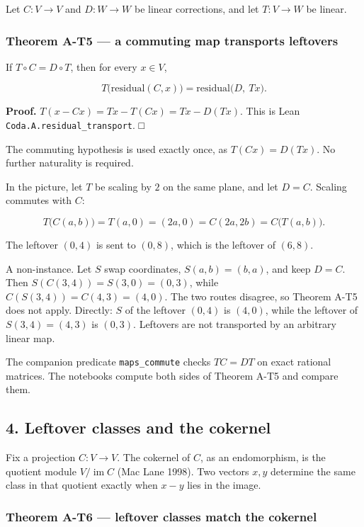 \documentclass[
  11pt,
]{article}
\begin{document}
Let \(C:V\to V\) and \(D:W\to W\) be linear corrections, and let \(T:V\to W\) be linear.

\subsubsection{Theorem A-T5 --- a commuting map transports leftovers}\label{theorem-a-t5-a-commuting-map-transports-leftovers}

If \(T\circ C=D\circ T\), then for every \(x\in V\),

\[
T\bigl(\mathrm{residual}(C,x)\bigr)
=
\mathrm{residual}\bigl(D,\ Tx\bigr).
\]

\textbf{Proof.} \(T(x-Cx)=Tx-T(Cx)=Tx-D(Tx)\). This is Lean \nolinkurl{Coda.A.residual_transport}. □

The commuting hypothesis is used exactly once, as \(T(Cx)=D(Tx)\). No further naturality is required.

In the picture, let \(T\) be scaling by \(2\) on the same plane, and let \(D=C\). Scaling commutes with \(C\):

\[
T\bigl(C(a,b)\bigr)=T(a,0)=(2a,0)=C(2a,2b)=C\bigl(T(a,b)\bigr).
\]

The leftover \((0,4)\) is sent to \((0,8)\), which is the leftover of \((6,8)\).

A non-instance. Let \(S\) swap coordinates, \(S(a,b)=(b,a)\), and keep \(D=C\). Then \(S(C(3,4))=S(3,0)=(0,3)\), while \(C(S(3,4))=C(4,3)=(4,0)\). The two routes disagree, so Theorem A-T5 does not apply. Directly: \(S\) of the leftover \((0,4)\) is \((4,0)\), while the leftover of \(S(3,4)=(4,3)\) is \((0,3)\). Leftovers are not transported by an arbitrary linear map.

The companion predicate \texttt{maps\_commute} checks \(TC=DT\) on exact rational matrices. The notebooks compute both sides of Theorem A-T5 and compare them.

\subsection{4. Leftover classes and the cokernel}\label{leftover-classes-and-the-cokernel}

Fix a projection \(C:V\to V\). The cokernel of \(C\), as an endomorphism, is the quotient module \(V/\operatorname{im} C\) (Mac Lane 1998). Two vectors \(x,y\) determine the same class in that quotient exactly when \(x-y\) lies in the image.

\subsubsection{Theorem A-T6 --- leftover classes match the cokernel}\label{theorem-a-t6-leftover-classes-match-the-cokernel}
\end{document}

